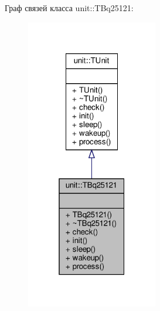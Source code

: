 Граф связей класса unit\+:\+:T\+Bq25121\+:\nopagebreak
\begin{figure}[H]
\begin{center}
\leavevmode
\includegraphics[width=163pt]{classunit_1_1_t_bq25121__coll__graph}
\end{center}
\end{figure}
